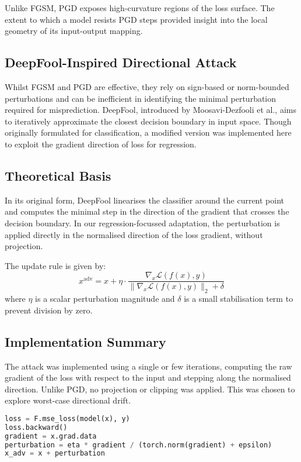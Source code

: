 Unlike FGSM, PGD exposes high-curvature regions of the loss surface. The extent to which a model resists PGD steps provided insight into the local geometry of its input-output mapping.

\subsection{DeepFool-Inspired Directional Attack}

Whilst FGSM and PGD are effective, they rely on sign-based or norm-bounded perturbations and can be inefficient in identifying the minimal perturbation required for misprediction. DeepFool, introduced by Moosavi-Dezfooli et al., aims to iteratively approximate the closest decision boundary in input space. Though originally formulated for classification, a modified version was implemented here to exploit the gradient direction of loss for regression.

\subsection{Theoretical Basis}
In its original form, DeepFool linearises the classifier around the current point and computes the minimal step in the direction of the gradient that crosses the decision boundary. In our regression-focussed adaptation, the perturbation is applied directly in the normalised direction of the loss gradient, without projection.

The update rule is given by:
\[
x^{\text{adv}} = x + \eta \cdot \frac{\nabla_x \mathcal{L}(f(x), y)}{ \| \nabla_x \mathcal{L}(f(x), y) \|_2 + \delta }
\]
where $\eta$ is a scalar perturbation magnitude and $\delta$ is a small stabilisation term to prevent division by zero.

\subsection{Implementation Summary}
The attack was implemented using a single or few iterations, computing the raw gradient of the loss with respect to the input and stepping along the normalised direction. Unlike PGD, no projection or clipping was applied. This was chosen to explore worst-case directional drift.

\begin{lstlisting}[language=Python, caption={Directional (DeepFool-like) Gradient Attack}]
loss = F.mse_loss(model(x), y)
loss.backward()
gradient = x.grad.data
perturbation = eta * gradient / (torch.norm(gradient) + epsilon)
x_adv = x + perturbation
\end{lstlisting}

